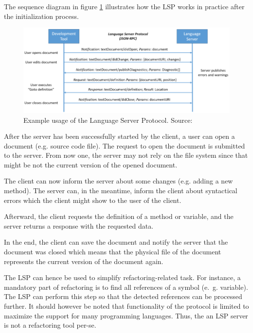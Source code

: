The sequence diagram in figure \ref{fig:lsp_usage} illustrates how the \ac{LSP} works in practice after the initialization process. 
\begin{figure}
    \centering
    \includegraphics{figures/chapter2/language-server-sequence.png}
    \caption{Example usage of the Language Server Protocol. Source: \cite{lsp_website} }
    \label{fig:lsp_usage}
    
\end{figure}

After the server has been successfully started by the client, a user can open a document (e.g. source code file). The request to open the document is submitted to the server. From now one, the server may not rely on the file system since that might be not the current version of the opened document. 

The client can now inform the server about some changes (e.g. adding a new method). The server can, in the meantime, inform the client about syntactical errors which the client might show to the user of the client.

Afterward, the client requests the definition of a method or variable, and the server returns a response with the requested data.

In the end, the client can save the document and notify the server that the document was closed which means that the physical file of the document represents the current version of the document again. 

The \ac{LSP} can hence be used to simplify refactoring-related task. For instance, a mandatory part of refactoring is to find all references of a symbol (e.~g. variable). The \ac{LSP} can perform this step so that the detected references can be processed further. It should however be noted that functionality of the protocol is limited to maximize the support for many programming languages. Thus, the an \ac{LSP} server is not a refactoring tool per-se. 





